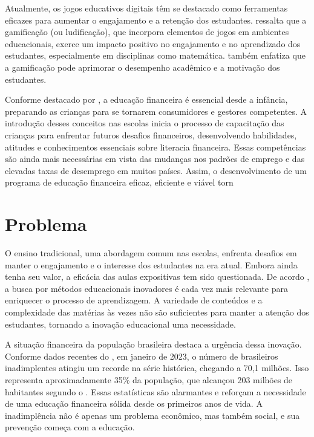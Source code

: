 Atualmente, os jogos educativos digitais têm se destacado como ferramentas eficazes para aumentar o engajamento e a retenção dos estudantes. \cite{lee2023} ressalta que a gamificação (ou ludificação), que incorpora elementos de jogos em ambientes educacionais, exerce um impacto positivo no engajamento e no aprendizado dos estudantes, especialmente em disciplinas como matemática. \cite{dahalan2023} também enfatiza que a gamificação pode aprimorar o desempenho acadêmico e a motivação dos estudantes.

Conforme destacado por \cite{masnan2016financial}, a educação financeira é essencial desde a infância, preparando as crianças para se tornarem consumidores e gestores competentes. A introdução desses conceitos nas escolas inicia o processo de capacitação das crianças para enfrentar futuros desafios financeiros, desenvolvendo habilidades, atitudes e conhecimentos essenciais sobre literacia financeira. Essas competências são ainda mais necessárias em vista das mudanças nos padrões de emprego e das elevadas taxas de desemprego em muitos países. Assim, o desenvolvimento de um programa de educação financeira eficaz, eficiente e viável torn


\section{Problema}

O ensino tradicional, uma abordagem comum nas escolas, enfrenta desafios em manter o engajamento e o interesse dos estudantes na era atual. Embora ainda tenha seu valor, a eficácia das aulas expositivas tem sido questionada. De acordo \cite{fortes2023aprendizagem}, a busca por métodos educacionais inovadores é cada vez mais relevante para enriquecer o processo de aprendizagem. A variedade de conteúdos e a complexidade das matérias às vezes não são suficientes para manter a atenção dos estudantes, tornando a inovação educacional uma necessidade.

A situação financeira da população brasileira destaca a urgência dessa inovação. Conforme dados recentes do \cite{SERASA_2023}, em janeiro de 2023, o número de brasileiros inadimplentes atingiu um recorde na série histórica, chegando a 70,1 milhões. Isso representa aproximadamente 35\% da população, que alcançou 203 milhões de habitantes segundo o \cite{IBGE_Censo_2022}. Essas estatísticas são alarmantes e reforçam a necessidade de uma educação financeira sólida desde os primeiros anos de vida. A inadimplência não é apenas um problema econômico, mas também social, e sua prevenção começa com a educação.

